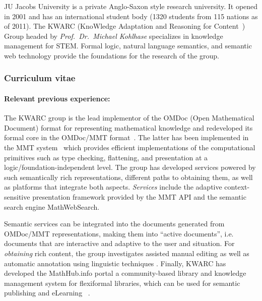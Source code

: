 \begin{sitedescription}{JU}
Jacobs University is a private Anglo-Saxon style research university.  It opened in 2001
and has an international student body (1320 students from 115 nations as of 2011).  The
KWARC (KnoWledge Adaptation and Reasoning for Content~\cite{KWARC:online}) Group headed by
{\emph{Prof.\ Dr.\ Michael Kohlhase}} specializes in knowledge management for STEM.
Formal logic, natural language semantics, and semantic web technology provide the
foundations for the research of the group.

\subsubsection*{Curriculum vitae}




\paragraph{Relevant previous experience:}

The KWARC group is the lead implementor of the OMDoc (Open Mathematical Document) format
for representing mathematical knowledge \cite{Kohlhase:OMDoc1.2} and redeveloped its
formal core in the OMDoc/MMT format~\cite{RabKoh:WSMSML13}. The latter has been
implemented in the MMT system~\cite{MMTSVN:on,RabKoh:WSMSML13} which provides efficient
implementations of the computational primitives such as type checking, flattening, and
presentation at a logic/foundation-independent level.  The group has developed services
powered by such semantically rich representations, different paths to obtaining them, as
well as platforms that integrate both aspects.  \emph{Services} include the adaptive
context-sensitive presentation framework provided by the MMT API and the semantic search
engine MathWebSearch\cite{KohSuc:asemf06,ProKoh:mwssofse12}. 

Semantic services can be integrated into the documents generated from OMDoc/MMT
representations, making them into ``active documents'', i.e. documents that are
interactive and adaptive to the user and situation.  For \emph{obtaining} rich content,
the group investigates assisted manual editing \cite{JucKoh:sidesc10:biblatex} as well as
automatic annotation using linguistic techniques \cite{GinJucAnc:alsaacl09}.  Finally,
KWARC has developed the \textsf{MathHub.info} portal a community-based library and
knowledge management system for flexiformal libraries, which can be used for semantic
publishing and eLearning~ \cite{KohDavGin:psewads11,MathHub:on,IanJucKoh:sdm14}.


\end{sitedescription}
